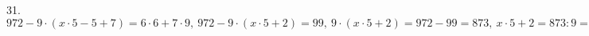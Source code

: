 31. $972-9\cdot(x\cdot 5-5+7)=6\cdot6+7\cdot9,\ 972-9\cdot(x\cdot 5+2)=99,\ 9\cdot(x\cdot 5+2)=972-99=873,\ x\cdot 5+2=873:9=97,\ x\cdot 5=97-2=95,\ x=95:5=19.$\\
